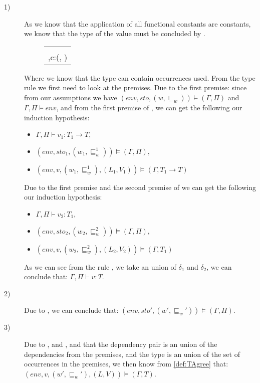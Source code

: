 \begin{description}
	\item[1)] As we know that the application of all functional constants are constants, we know that the type of the value must be concluded by .
	\begin{figure}[H]
		\setlength\tabcolsep{8pt}
		\begin{tabular}{l}
		\runa{Constant}\\[0.2cm]
			\inference[]{}
				{\Gamma,\Pi\vdash  c:(\delta, \emptyset)}\\[1cm]
		\end{tabular}
	\end{figure}
	Where we know that the type can contain occurrences used.
	From the type rule  we first need to look at the premises.
	Due to the first premise: since from our assumptions we have $(env,sto,(w,\sqsubseteq_w))\models(\Gamma,\Pi)$ and $\Gamma,\Pi\models env$, and from the first premise of , we can get the following our induction hypothesis:
	\begin{itemize}
		\item $\Gamma,\Pi\vdash v_1:T_1\rightarrow T$,
		\item $(env,sto_1,(w_1,\sqsubseteq_w^1))\models(\Gamma,\Pi)$,
		\item $(env,v,(w_1,\sqsubseteq_w^1),(L_1,V_1))\models(\Gamma,T_1\rightarrow T)$
	\end{itemize}

	Due to the first premise and the second premise of  we can get the following our induction hypothesis:
	\begin{itemize}
		\item $\Gamma,\Pi\vdash v_2:T_1$,
		\item $(env,sto_2,(w_2,\sqsubseteq_w^2))\models(\Gamma,\Pi)$,
		\item $(env,v,(w_2,\sqsubseteq_w^2),(L_2,V_2))\models(\Gamma,T_1)$
	\end{itemize}
	As we can see from the rule , we take an union of $\delta_1$ and $\delta_2$, we can conclude that: $\Gamma,\Pi\vdash v:T$.

\item[2)] Due to , we can conclude that: $(env,sto',(w',\sqsubseteq_w'))\models(\Gamma,\Pi)$.

\item[3)] Due to , and , and that the dependency pair is an union of the dependencies from the premises, and the type is an union of the set of occurrences in the premises, 
	we then know from \cref{def:TAgree} that: $(env,v,(w',\sqsubseteq_w'),(L,V))\models(\Gamma,T)$.
\end{description}
